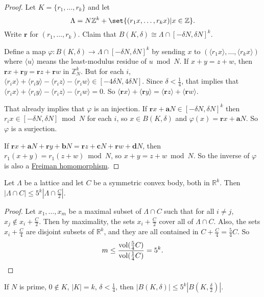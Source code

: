 \documentclass{article}
\newcommand{\1}[1]{\mathbbm{1}_{#1}}
\begin{document}
\begin{proof}
  Let $K = \{r_1, \dotsc, r_k\}$ and let
  \begin{equation*}\Lambda = N \mathbb{Z}^k + \set{(r_1 x, \dotsc, r_k x) | x \in \mathbb{Z}}.\end{equation*}
  Write $\mathbf{r}$ for $(r_1, \dotsc, r_k)$.
  Claim that $B(K, \delta) \cong \Lambda \cap [-\delta N, \delta N]^k$.

  Define a map $\varphi: B(K, \delta) \to \Lambda \cap [-\delta N, \delta N]^k$ by sending $x$ to $(\langle r_1 x \rangle, \dotsc, \langle r_k x \rangle)$ where $\langle u \rangle$ means the least-modulus residue of $u \bmod N$.
  If $x + y = z + w$, then $\mathbf{r} x + \mathbf{r} y = \mathbf{r} z + \mathbf{r} w$ in $\mathbb{Z}_N^k$.
  But for each $i$, $\langle r_i x \rangle + \langle r_i y \rangle - \langle r_i z \rangle - \langle r_i w \rangle \in [-4 \delta N, 4 \delta N]$.
  Since $\delta < \frac{1}{4}$, that implies that $\langle r_i x \rangle + \langle r_i y\rangle - \langle r_i z \rangle - \langle r_i w \rangle = 0$.
  So $\langle \mathbf{r} x \rangle + \langle \mathbf{r} y \rangle = \langle \mathbf{r} z \rangle + \langle \mathbf{r} w \rangle$.

  That already implies that $\varphi$ is an injection.
  If $\mathbf{r} x + \mathbf{a} N \in [-\delta N, \delta N]^k$ then $r_i x \in [-\delta N, \delta N] \bmod{N}$ for each $i$, so $x \in B(K, \delta)$ and $\varphi(x) = \mathbf{r} x + \mathbf{a} N$.
  So $\varphi$ is a surjection.

  If $\mathbf{r} x + \mathbf{a} N + \mathbf{r} y + \mathbf{b} N = \mathbf{r} z + \mathbf{c} N + \mathbf{r} w + \mathbf{d} N$, then $r_1 (x+y) = r_1 (z + w) \bmod{N}$, so $x + y = z + w \bmod{N}$.
  So the inverse of $\varphi$ is also a \hyperlink{def:fhom}{Freiman homomorphism}.
\end{proof}
\begin{nlemma}\label{lem:1.10}
  Let $\Lambda$ be a lattice and let $C$ be a symmetric convex body, both in $\mathbb{R}^k$.
  Then $|\Lambda \cap C| \leq 5^k |\Lambda \cap \frac{C}{2}|$.
\end{nlemma}
\begin{proof}
  Let $x_1, \dotsc, x_m$ be a maximal subset of $\Lambda \cap C$ such that for all $i \neq j$, $x_j \notin x_i + \frac{C}{2}$.
  Then by maximality, the sets $x_i + \frac{C}{2}$ cover all of $\Lambda \cap C$.
  Also, the sets $x_i + \frac{C}{4}$ are disjoint subsets of $\mathbb{R}^k$, and they are all contained in $C + \frac{C}{4} = \frac{5}{4} C$.
  So
  \begin{equation*}
    m \leq \frac{\operatorname{vol}(\frac{5}{4} C)}{\operatorname{vol}(\frac{1}{4} C)} = 5^k. \qedhere
  \end{equation*}
\end{proof}
\begin{ncor}
  If $N$ is prime, $0 \notin K$, $|K| = k$, $\delta < \frac{1}{4}$, then $|B(K,\delta)| \leq 5^k |B(K, \frac{\delta}{2})|$.
\end{ncor}
\end{document}
